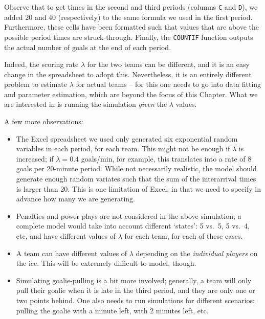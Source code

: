 Observe that to get times in the second and third periods (columns \texttt{C} and \texttt{D}), we added 20 and 40 (respectively) to the same formula we used in the first period.
Furthermore, these cells have been formatted such that values that are above the possible period times are struck-through.
Finally, the \texttt{COUNTIF} function outputs the actual number of goals at the end of each period.

Indeed, the scoring rate $\lambda$ for the two teams can be different, and it is an easy change in the spreadsheet to adopt this.
Nevertheless, it is an entirely different problem to estimate $\lambda$ for actual teams -- for this one needs to go into data fitting and parameter estimation, which are beyond the focus of this Chapter.
What we are interested in is running the simulation \emph{given} the $\lambda$ values.

A few more observations:
\begin{itemize}
	\item The Excel spreadsheet we used only generated six exponential random variables in each period, for each team.
		This might not be enough if $\lambda$ is increased; if $\lambda = 0.4$ goals/min, for example, this translates into a rate of 8 goals per 20-minute period.
		While not necessarily realistic, the model should generate enough random variates such that the sum of the interarrival times is larger than 20.
		This is one limitation of Excel, in that we need to specify in advance how many we are generating.
	\item Penalties and power plays are not considered in the above simulation; a complete model would take into account different `states': 5 vs.~5, 5 vs.~4, etc, and have different values of $\lambda$ for each team, for each of these cases.
	\item A team can have different values of $\lambda$ depending on the \emph{individual players} on the ice.
		This will be extremely difficult to model, though.
	\item Simulating goalie-pulling is a bit more involved; generally, a team will only pull their goalie when it is late in the third period, and they are only one or two points behind.
		One also needs to run simulations for different scenarios: pulling the goalie with a minute left, with 2 minutes left, etc.
\end{itemize}

